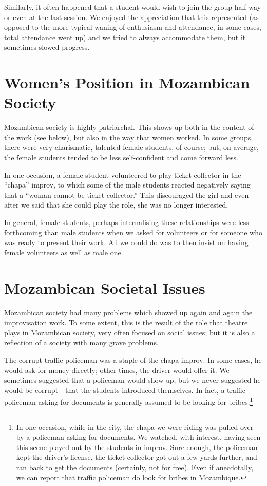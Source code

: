 \documentclass[article,twocolumn,twoside]{memoir}
\begin{document}
Similarly, it often happened that a student would wish to join the group
half-way or even at the last session. We enjoyed the appreciation that this
represented (as opposed to the more typical waning of enthusiasm and
attendance, in some cases, total attendance went up) and we tried to always
accommodate them, but it sometimes slowed progress.

\section{Women's Position in Mozambican Society}

Mozambican society is highly patriarchal. This shows up both in the content
of the work (see below), but also in the way that women worked. In some groups,
there were very charismatic, talented female students, of course; but, on
average, the female students tended to be less self-confident and come forward
less.

In one occasion, a female student volunteered to play ticket-collector in the
``chapa'' improv, to which some of the male students reacted negatively saying
that a ``woman cannot be ticket-collector.'' This discouraged the girl and even
after we said that she could play the role, she was no longer interested.

In general, female students, perhaps internalising these relationships were
less forthcoming than male students when we asked for volunteers or for someone
who was ready to present their work. All we could do was to then insist on
having female volunteers as well as male one.

\section{Mozambican Societal Issues}

Mozambican society had many problems which showed up again and again the
improvisation work. To some extent, this is the result of the role that theatre
plays in Mozambican society, very often focused on social issues; but it is
also a reflection of a society with many grave problems.

The corrupt traffic policeman was a staple of the chapa improv. In some cases,
he would ask for money directly; other times, the driver would offer it. We
sometimes suggested that a policeman would show up, but we never suggested he
would be corrupt---that the students introduced themselves. In fact, a traffic
policeman asking for documents is generally assumed to be looking for
bribes.\footnote{In one occasion, while in the city, the chapa we were riding
was pulled over by a policeman asking for documents. We watched, with interest,
having seen this scene played out by the students in improv. Sure enough, the
policeman kept the driver's license, the ticket-collector got out a few yards
further, and ran back to get the documents (certainly, not for free). Even if
anecdotally, we can report that traffic policeman do look for bribes in
Mozambique.}
\end{document}
